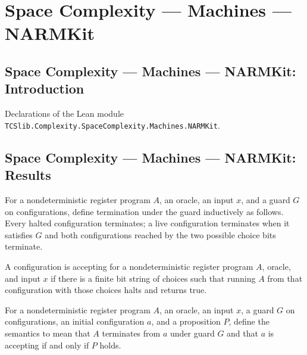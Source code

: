 \section{Space Complexity --- Machines --- NARMKit}
\subsection*{Space Complexity --- Machines --- NARMKit: Introduction}

Declarations of the Lean module \texttt{TCSlib.Complexity.SpaceComplexity.Machines.NARMKit}.

\subsection*{Space Complexity --- Machines --- NARMKit: Results}

\begin{definition}
\label{Complexity.LogProg.NTerm}
\leanok
{}
For a nondeterministic register program $A$, an oracle, an input $x$, and a guard $G$ on
configurations, define termination under the guard inductively as follows. Every halted
configuration terminates; a live configuration terminates when it satisfies $G$ and both
configurations reached by the two possible choice bits terminate.
\end{definition}

\begin{definition}
\label{Complexity.LogProg.NAcc}
\leanok
{}
A configuration is accepting for a nondeterministic register program $A$, oracle, and
input $x$ if there is a finite bit string of choices such that running $A$ from that
configuration with those choices halts and returns true.
\end{definition}

\begin{definition}
\label{Complexity.LogProg.NSem}
\leanok
{}
For a nondeterministic register program $A$, an oracle, an input $x$, a guard $G$ on
configurations, an initial configuration $a$, and a proposition $P$, define the
semantics to mean that $A$ terminates from $a$ under guard $G$ and that $a$ is accepting
if and only if $P$ holds.
\end{definition}

